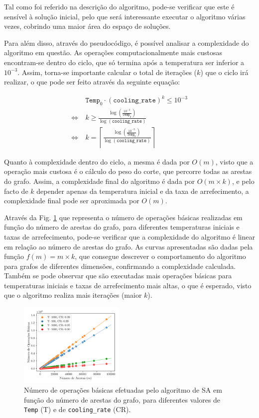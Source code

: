 \documentclass[mirror, portugues]{revdetua}
\begin{document}
Tal como foi referido na descrição do algoritmo, pode-se verificar que este é sensível à solução inicial, pelo que será interessante executar o algoritmo várias vezes, cobrindo uma maior área do espaço de soluções.

Para além disso, através do pseudocódigo, é possível analisar a complexidade do algoritmo em questão. As operações computacionalmente mais custosas encontram-se dentro do ciclo, que só termina após a temperatura ser inferior a $10^{-3}$. Assim, torna-se importante calcular o total de iterações ($k$) que o ciclo irá realizar, o que pode ser feito através da seguinte equação:

\begin{align*}
    &\texttt{Temp}_0 \cdot (\texttt{cooling\_rate})^k \le 10^{-3} \\
    \Leftrightarrow\ &  k \geq  \frac{\log\left(\frac{10^{-3}}{\texttt{Temp}_0}\right)}{\log(\texttt{cooling\_rate})} \\
    \Leftrightarrow\ & k = \left\lceil \frac{\log\left(\frac{10^{-3}}{\texttt{Temp}_0}\right)}{\log(\texttt{cooling\_rate})} \right\rceil
\end{align*}

\noindent Quanto à complexidade dentro do ciclo, a mesma é dada por $O(m)$, visto que a operação mais custosa é o cálculo do peso do corte, que percorre todas as arestas do grafo. Assim, a complexidade final do algoritmo é dada por $O(m \times k)$, e pelo facto de $k$ depender apenas da temperatura inicial e da taxa de arrefecimento, a complexidade final pode ser aproximada por $O(m)$.

Através da Fig. \ref{fig:sa_ops} que representa o número de operações básicas realizadas em função do número de arestas do grafo, para diferentes temperaturas iniciais e taxas de arrefecimento, pode-se verificar que a complexidade do algoritmo é linear em relação ao número de arestas do grafo. As curvas apresentadas são dadas pela função $f(m) = m \times k$, que consegue descrever o comportamento do algoritmo para grafos de diferentes dimensões, confirmando a complexidade calculada. Também se pode observar que são executadas mais operações básicas para temperaturas iniciais e taxas de arrefecimento mais altas, o que é esperado, visto que o algoritmo realiza mais iterações (maior $k$).

\begin{figure}[H]
    \centering
    \includegraphics[width=0.45\textwidth]{../assets/ops_Simulated .png}
    \caption{Número de operações básicas efetuadas pelo algoritmo de SA em função do número de arestas do grafo, para diferentes valores de \texttt{Temp} (T) e de \texttt{cooling\_rate} (CR).}
    \label{fig:sa_ops}
\end{figure}
\end{document}

